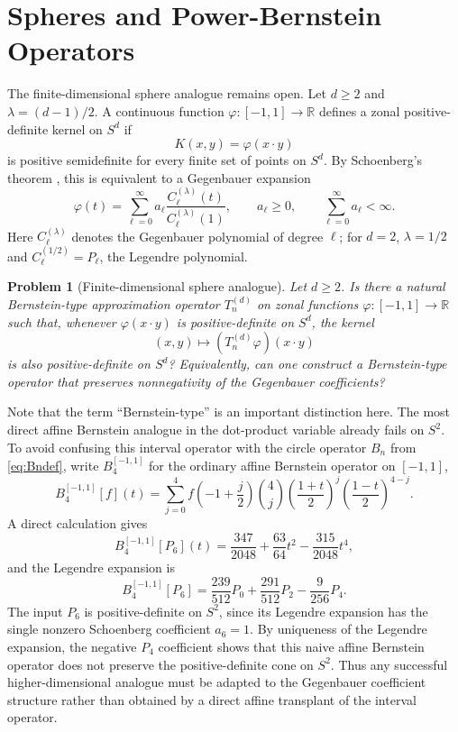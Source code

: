 \documentclass[a4paper,12pt]{amsart}
\newtheorem{problem}[theorem]{Problem}
\theoremstyle{definition}
\theoremstyle{remark}
\begin{document}
\section{Spheres and Power-Bernstein Operators}

The finite-dimensional sphere analogue remains open. Let $d \ge 2$ and $\lambda = (d-1)/2 $. A continuous function $\varphi:[-1,1] \to \mathbb R$ defines a zonal positive-definite kernel on $S^d$ if
\[
K(x,y)=\varphi(x\cdot y)
\]
is positive semidefinite for every finite set of points on $S^d$. By Schoenberg's theorem \cite{Schoenberg1942PositiveDF,Gneiting2013Spheres}, this is equivalent to a Gegenbauer expansion
\[
\varphi(t)=\sum_{\ell=0}^{\infty} a_\ell
\frac{C_\ell^{(\lambda)}(t)}{C_\ell^{(\lambda)}(1)},
\qquad a_\ell\ge0,
\qquad \sum_{\ell=0}^{\infty}a_\ell<\infty.
\]
Here $C_\ell^{(\lambda)}$ denotes the Gegenbauer polynomial of degree $\ell$; for $d=2$, $\lambda=1/2$ and $C_\ell^{(1/2)}=P_\ell$, the Legendre polynomial.

\begin{problem}[Finite-dimensional sphere analogue]
\label{conj:spheres}
Let $d\ge2$. Is there a natural Bernstein-type approximation operator $T_n^{(d)}$ on zonal functions $\varphi:[-1,1]\to\mathbb R$ such that, whenever $\varphi(x\cdot y)$ is positive-definite on $S^d$, the kernel
\[
(x,y)\mapsto (T_n^{(d)}\varphi)(x\cdot y)
\]
is also positive-definite on $S^d$? Equivalently, can one construct a Bernstein-type operator that preserves nonnegativity of the Gegenbauer coefficients?
\end{problem}

Note that the term ``Bernstein-type'' is an important distinction here. The most direct affine Bernstein analogue in the dot-product variable already fails on $S^2$. To avoid confusing this interval operator with the circle operator $B_n$ from \eqref{eq:Bndef}, write $B_4^{[-1,1]}$ for the ordinary affine Bernstein operator on $[-1,1]$,
\[
B_4^{[-1,1]}[f](t) =\sum_{j=0}^{4} f\!\left(-1+\frac{j}{2}\right)
\binom{4}{j}\left(\frac{1+t}{2}\right)^j
\left(\frac{1-t}{2}\right)^{4-j}.
\]
A direct calculation gives
\[
B_4^{[-1,1]}[P_6](t) = \frac{347}{2048}+\frac{63}{64}t^2-\frac{315}{2048}t^4,
\]
and the Legendre expansion is
\[
B_4^{[-1,1]}[P_6]
=\frac{239}{512}P_0+\frac{291}{512}P_2-\frac{9}{256}P_4.
\]
The input $P_6$ is positive-definite on $S^2$, since its Legendre expansion has the single nonzero Schoenberg coefficient $a_6=1$. By uniqueness of the Legendre expansion, the negative $P_4$ coefficient shows that this naive affine Bernstein operator does not preserve the positive-definite cone on $S^2$. Thus any successful higher-dimensional analogue must be adapted to the Gegenbauer coefficient structure rather than obtained by a direct affine transplant of the interval operator.
\end{document}
